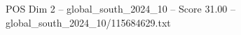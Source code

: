\begin{textsample}{POS Dim 2 – global\_south\_2024\_10 – Score 31.00 – global\_south\_2024\_10/115684629.txt}
\end{textsample}
